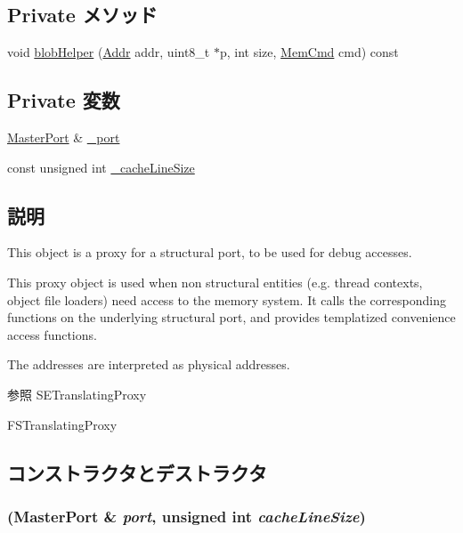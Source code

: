 \subsection*{Private メソッド}
\begin{DoxyCompactItemize}
\item 
void \hyperlink{classPortProxy_af1e843344eae366925dc9e05757a901d}{blobHelper} (\hyperlink{base_2types_8hh_af1bb03d6a4ee096394a6749f0a169232}{Addr} addr, uint8\_\-t $\ast$p, int size, \hyperlink{classMemCmd}{MemCmd} cmd) const 
\end{DoxyCompactItemize}
\subsection*{Private 変数}
\begin{DoxyCompactItemize}
\item 
\hyperlink{classMasterPort}{MasterPort} \& \hyperlink{classPortProxy_a670fb48d4e7284a258fb4ab405d2fba3}{\_\-port}
\item 
const unsigned int \hyperlink{classPortProxy_a6e1b97389f603fc046fbb42ba91136e2}{\_\-cacheLineSize}
\end{DoxyCompactItemize}


\subsection{説明}
This object is a proxy for a structural port, to be used for debug accesses.

This proxy object is used when non structural entities (e.g. thread contexts, object file loaders) need access to the memory system. It calls the corresponding functions on the underlying structural port, and provides templatized convenience access functions.

The addresses are interpreted as physical addresses.

\begin{DoxySeeAlso}{参照}
SETranslatingProxy 

FSTranslatingProxy 
\end{DoxySeeAlso}


\subsection{コンストラクタとデストラクタ}
\hypertarget{classPortProxy_a832d66d0a463df34b58086c504afe729}{
\subsubsection[{PortProxy}]{ ({\bf MasterPort} \& {\em port}, \/  unsigned int {\em cacheLineSize})}}
\label{classPortProxy_a832d66d0a463df34b58086c504afe729}



